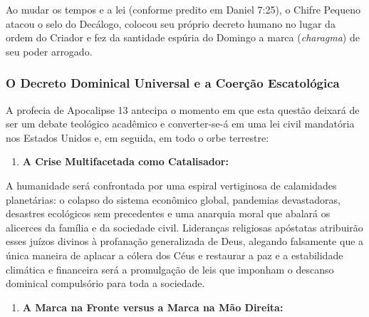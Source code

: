 \documentclass[11pt,a4paper,openany]{book}
\begin{document}
Ao mudar os tempos e a lei (conforme predito em Daniel 7:25), o Chifre Pequeno atacou o selo do Decálogo, colocou seu próprio decreto humano no lugar da ordem do Criador e fez da santidade espúria do Domingo a marca (\textit{charagma}) de seu poder arrogado.


\subsubsection*{O Decreto Dominical Universal e a Coerção Escatológica}


A profecia de Apocalipse 13 antecipa o momento em que esta questão deixará de ser um debate teológico acadêmico e converter-se-á em uma lei civil mandatória nos Estados Unidos e, em seguida, em todo o orbe terrestre:

\begin{enumerate}
  \item \textbf{A Crise Multifacetada como Catalisador:}
\end{enumerate}

A humanidade será confrontada por uma espiral vertiginosa de calamidades planetárias: o colapso do sistema econômico global, pandemias devastadoras, desastres ecológicos sem precedentes e uma anarquia moral que abalará os alicerces da família e da sociedade civil. Lideranças religiosas apóstatas atribuirão esses juízos divinos à profanação generalizada de Deus, alegando falsamente que a única maneira de aplacar a cólera dos Céus e restaurar a paz e a estabilidade climática e financeira será a promulgação de leis que imponham o descanso dominical compulsório para toda a sociedade.
\begin{enumerate}
  \item \textbf{A Marca na Fronte versus a Marca na Mão Direita:}
\end{enumerate}
\end{document}
